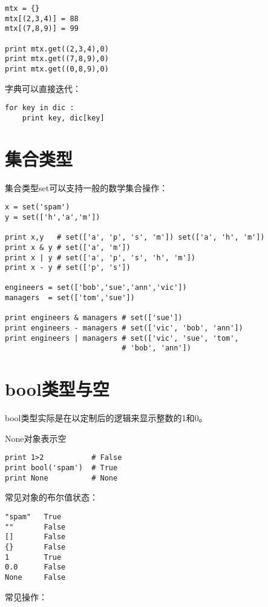 \begin{lstlisting}
mtx = {}
mtx[(2,3,4)] = 88
mtx[(7,8,9)] = 99

print mtx.get((2,3,4),0)
print mtx.get((7,8,9),0)
print mtx.get((0,8,9),0)
\end{lstlisting}

字典可以直接迭代：

\begin{lstlisting}
for key in dic :
	print key, dic[key]
\end{lstlisting}

\section{集合类型}

集合类型set可以支持一般的数学集合操作：

\begin{lstlisting}
x = set('spam')
y = set(['h','a','m'])

print x,y   # set(['a', 'p', 's', 'm']) set(['a', 'h', 'm'])
print x & y # set(['a', 'm'])
print x | y # set(['a', 'p', 's', 'h', 'm'])
print x - y # set(['p', 's'])

engineers = set(['bob','sue','ann','vic'])
managers  = set(['tom','sue'])

print engineers & managers # set(['sue'])
print engineers - managers # set(['vic', 'bob', 'ann'])
print engineers | managers # set(['vic', 'sue', 'tom', 
                           # 'bob', 'ann'])
\end{lstlisting}

\section{bool类型与空}

bool类型实际是在以定制后的逻辑来显示整数的1和0。

None对象表示空

\begin{lstlisting}
print 1>2           # False
print bool('spam')  # True
print None          # None
\end{lstlisting}

常见对象的布尔值状态：

\begin{lstlisting}
"spam"   True
""       False
[]       False
{}       False
1        True
0.0      False
None     False
\end{lstlisting}

常见操作：


